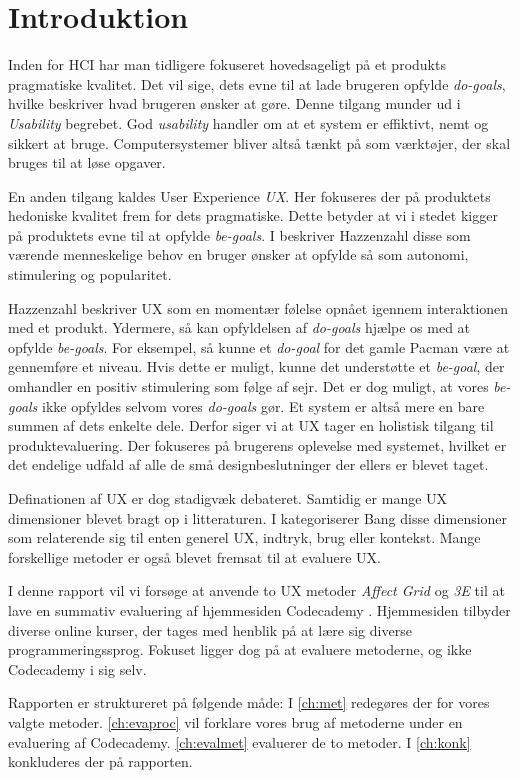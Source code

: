 \chapter{Introduktion}\label{ch:intro}
Inden for HCI har man tidligere fokuseret hovedsageligt på et produkts pragmatiske kvalitet. Det vil sige, dets evne til at lade brugeren opfylde \textit{do-goals}, hvilke beskriver hvad brugeren ønsker at gøre. Denne tilgang munder ud i \textit{Usability} begrebet. God \textit{usability} handler om at et system er effiktivt, nemt og sikkert at bruge. Computersystemer bliver altså tænkt på som værktøjer, der skal bruges til at løse opgaver.

En anden tilgang kaldes User Experience \textit{UX}. Her fokuseres der på produktets hedoniske kvalitet frem for dets pragmatiske. Dette betyder at vi i stedet kigger på produktets evne til at opfylde \textit{be-goals}. I \cite{Hassenzahl:2008} beskriver Hazzenzahl disse som værende menneskelige behov en bruger ønsker at opfylde så som autonomi, stimulering og popularitet.

Hazzenzahl beskriver UX som en momentær følelse opnået igennem interaktionen med et produkt. Ydermere, så kan opfyldelsen af \textit{do-goals} hjælpe os med at opfylde \textit{be-goals}. For eksempel, så kunne et \textit{do-goal} for det gamle Pacman være at gennemføre et niveau. Hvis dette er muligt, kunne det understøtte et \textit{be-goal}, der omhandler en positiv stimulering som følge af sejr. Det er dog muligt, at vores \textit{be-goals} ikke opfyldes selvom vores \textit{do-goals} gør. Et system er altså mere en bare summen af  dets enkelte dele. Derfor siger vi at UX tager en holistisk tilgang til produktevaluering. Der fokuseres på brugerens oplevelse med systemet, hvilket er det endelige udfald af alle de små designbeslutninger der ellers er blevet taget.  

Definationen af UX er dog stadigvæk debateret. Samtidig er mange UX dimensioner blevet bragt op i litteraturen. I \cite{Bang2015} kategoriserer Bang disse dimensioner som relaterende sig til enten generel UX, indtryk, brug eller kontekst. Mange forskellige metoder er også blevet fremsat til at evaluere UX. 

I denne rapport vil vi forsøge at anvende to UX metoder \textit{Affect Grid} og \textit{3E} til at lave en summativ evaluering af hjemmesiden Codecademy \cite{Codecademy}. Hjemmesiden tilbyder diverse online kurser, der tages med henblik på at lære sig diverse programmeringssprog. Fokuset ligger dog på at evaluere metoderne, og ikke Codecademy i sig selv. 

Rapporten er struktureret på følgende måde: I \cref{ch:met} redegøres der for vores valgte metoder. \cref{ch:evaproc} vil forklare vores brug af metoderne under en evaluering af Codecademy. \cref{ch:evalmet} evaluerer de to metoder. I \cref{ch:konk} konkluderes der på rapporten.



   